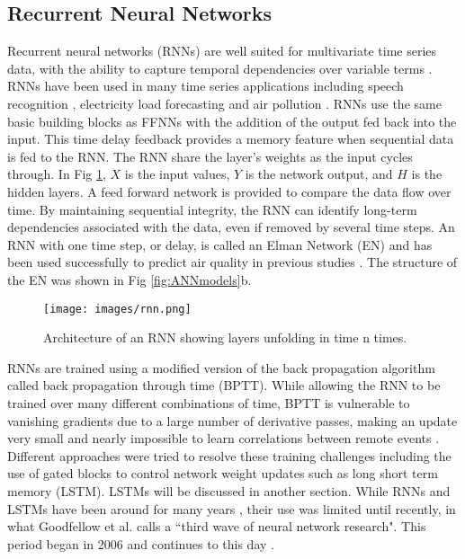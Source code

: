 \documentclass[preprint,12pt,a4paper,authoryear]{elsarticle}
\begin{document}
\begin{linenumbers}
\subsection{Recurrent Neural Networks}
Recurrent neural networks (RNNs) are well suited for multivariate time series data, with the ability to capture temporal dependencies over variable terms \citep{Che2016}. RNNs have been used in many time series applications including speech recognition \citep{Graves2013}, electricity load forecasting \citep{Walid2017} and air pollution \citep{Gomez2003}. RNNs use the same basic building blocks as FFNNs with the addition of the output fed back into the input. This time delay feedback provides a memory feature when sequential data is fed to the RNN. The RNN share the layer's weights as the input cycles through. In Fig \ref{fig:rnn}, $X$ is the input values, $Y$ is the network output, and $H$ is the hidden layers. A feed forward network is provided to compare the data flow over time. By maintaining sequential integrity, the RNN can identify long-term dependencies associated with the data, even if removed by several time steps. An RNN with one time step, or delay, is called an Elman Network (EN) and has been used successfully to predict air quality in previous studies \citep{Biancofiore2015, Biancofiore2017}. The structure of the EN was shown in Fig \ref{fig:ANNmodels}b.

%
\begin{figure}[H]
\centering
\texttt{[image: images/rnn.png]}  %
\caption{Architecture of an RNN showing layers unfolding in time n times.}
\label{fig:rnn}
\end{figure}
%

RNNs are trained using a modified version of the back propagation algorithm called back propagation through time (BPTT). While allowing the RNN to be trained over many different combinations of time, BPTT is vulnerable to vanishing gradients due to a large number of derivative passes, making an update very small and nearly impossible to learn correlations between remote events \citep{Pascanu2013, Graves2013a}. Different approaches were tried to resolve these training challenges including the use of gated blocks to control network weight updates such as long short term memory (LSTM). LSTMs will be discussed in another section. While RNNs and LSTMs have been around for many years \cite{Hochreiter1997}, their use was limited until recently, in what Goodfellow et al. calls a ``third wave of neural network research". This period began in 2006 and continues to this day \citep{Goodfellow2016}.


\end{linenumbers}
\end{document}
